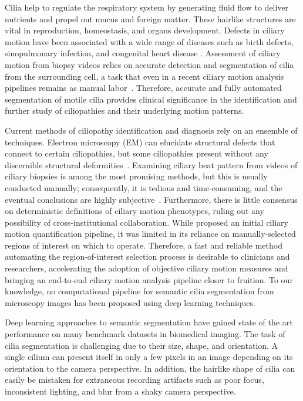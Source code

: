 \documentclass{llncs}
\begin{document}
Cilia help to regulate the respiratory system by generating fluid flow to deliver nutrients and propel out mucus and foreign matter. These hairlike structures are vital in reproduction, homeostasis, and  organs development. Defects in ciliary motion have been associated with a wide range of diseases such as birth defects, sinopulmonary infection, and congenital heart disease \cite{Ciliopathy}. Assessment of ciliary motion from biopsy videos relies on accurate detection and segmentation of cilia from the surrounding cell, a task that even in a recent ciliary motion analysis pipelines remains as manual labor~\cite{QuinnSTM}. Therefore, accurate and fully automated segmentation of motile cilia provides clinical significance in the identification and further study of ciliopathies and their underlying motion patterns. 
\par 
Current methods of ciliopathy identification and diagnosis rely on an ensemble of techniques. Electron microscopy (EM) can elucidate structural defects that connect to certain ciliopathies, but some ciliopathies present without any discernible structural deformities~\cite{CiliaEM}. Examining ciliary beat pattern from videos of ciliary biopsies is among the most promising methods, but this is usually conducted manually; consequently, it is tedious and time-consuming, and the eventual conclusions are highly subjective~\cite{CiliaCM}. Furthermore, there is little consensus on deterministic definitions of ciliary motion phenotypes, ruling out any possibility of cross-institutional collaboration. While \cite{QuinnSTM} proposed an initial ciliary motion quantification pipeline, it was limited in its reliance on manually-selected regions of interest on which to operate. Therefore, a fast and reliable method automating the region-of-interest selection process is desirable to clinicians and researchers, accelerating the adoption of objective ciliary motion measures and bringing an end-to-end ciliary motion analysis pipeline closer to fruition. To our knowledge, no computational pipeline for semantic cilia segmentation from microscopy images has been proposed using deep learning techniques. 
\par
Deep learning approaches to semantic segmentation have gained state of the art performance on many benchmark datasets in biomedical imaging. The task of cilia segmentation is challenging due to their size, shape, and orientation. A single cilium can present itself in only a few pixels in an image depending on its orientation to the camera perspective. In addition, the hairlike shape of cilia can easily be mistaken for extraneous recording artifacts such as poor focus, inconsistent lighting, and blur from a shaky camera perspective.
\end{document}
